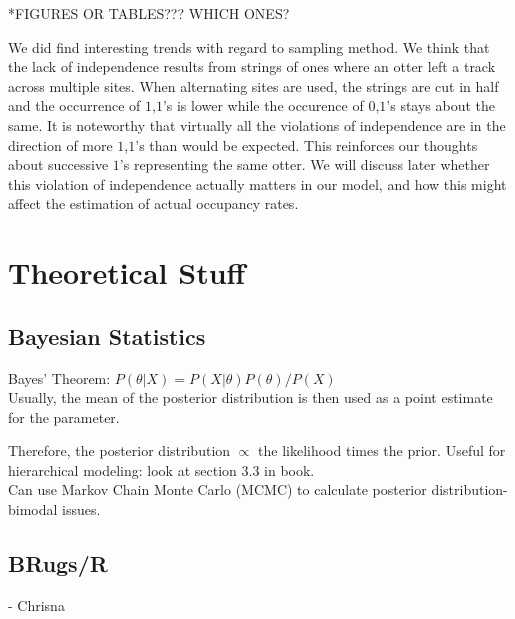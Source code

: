 \documentclass{article}
\begin{document}
*FIGURES OR TABLES??? WHICH ONES?

	We did find interesting trends with regard to sampling method.  We think 
that the lack of independence results from strings of ones where an otter left a
track across multiple sites.  When alternating sites are used, the strings are 
cut in half and the occurrence of \(1\),\(1\)'s is lower while the occurence of 
\(0\),\(1\)'s stays about the same.  It is noteworthy that virtually all the 
violations of independence are in the direction of more \(1\),\(1\)'s than would
be expected.  This reinforces our thoughts about successive \(1\)'s representing
the same otter.  We will discuss later whether this violation of independence 
actually matters in our model, and how this might affect the estimation of 
actual occupancy rates.

\section{Theoretical Stuff} 

	\subsection{Bayesian Statistics}

	   	Bayes' Theorem: \(P(\theta|X) = P(X|\theta)P(\theta) / P(X)\) \\

	Usually, the mean of the posterior distribution is then used as a point 
estimate for the parameter.  
  	

Therefore, the posterior distribution \( \propto \) the likelihood times the prior.
    	Useful for hierarchical modeling: look at section 3.3 in book. \\
    	Can use Markov Chain Monte Carlo (MCMC) to calculate posterior 
			distribution- bimodal issues.
	
	\subsection{BRugs/R} - Chrisna
\end{document}
